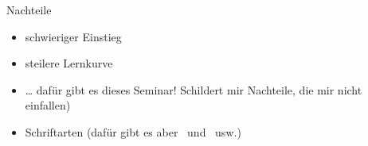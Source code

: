 \begin{frame}{Nachteile}

\begin{itemize}
\itemsep1pt\parskip0pt
\item
  schwieriger Einstieg
\item
  steilere Lernkurve
\item
  \ldots{} dafür gibt es dieses Seminar! Schildert mir Nachteile, die
  mir nicht einfallen)
\item
  Schriftarten (dafür gibt es aber \XeTeX \ und \LuaTeX \ usw.)
\end{itemize}

\end{frame}
